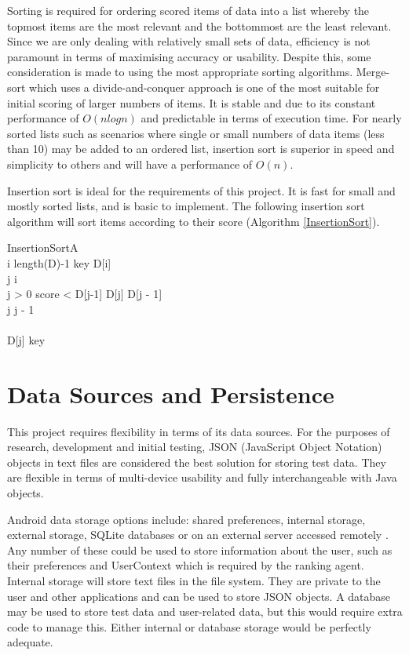 Sorting is required for ordering scored items of data into a list whereby the topmost items are the most relevant and the bottommost are the least relevant. Since we are only dealing with relatively small sets of data, efficiency is not paramount in terms of maximising accuracy or usability. Despite this, some consideration is made to using the most appropriate sorting algorithms. 
Merge-sort which uses a divide-and-conquer approach is one of the most suitable for initial scoring of larger numbers of items. It is stable and due to its constant performance of $O(nlogn)$ and predictable in terms of execution time. 
For nearly sorted lists such as scenarios where single or small numbers of data items (less than 10) may be added to an ordered list, insertion sort is superior in speed and simplicity to others and will have a performance of $O(n)$.

Insertion sort is ideal for the requirements of this project. It is fast for small and mostly sorted lists, and is basic to implement. The following insertion sort algorithm will sort items according to their score (Algorithm \ref{InsertionSort}).

\begin{pseudocode}{InsertionSort}{A}
	\label{InsertionSort}
	\\
	\FOR i \TO length(D)-1 \DO
	\BEGIN
		key \GETS D[i]\\
		j \GETS i\\
		\WHILE j > 0 \AND score < D[j-1] \DO
		\BEGIN
			D[j] \GETS D[j - 1]\\
			j \GETS j - 1\\
		\END \\
		D[j] \GETS key \\
	\END	
		
\end{pseudocode}

\section{Data Sources and Persistence}

This project requires flexibility in terms of its data sources. For the purposes of research, development and initial testing, JSON (JavaScript Object Notation) objects in text files are considered the best solution for storing test data. They are flexible in terms of multi-device usability and fully interchangeable with Java objects.

Android data storage options include: shared preferences, internal storage, external storage, SQLite databases or on an external server accessed remotely \cite{BeginningAndroidDataPersistence}. Any number of these could be used to store information about the user, such as their preferences and UserContext which is required by the ranking agent. Internal storage will store text files in the file system. They are private to the user and other applications and can be used to store JSON objects. A database may be used to store test data and user-related data, but this would require extra code to manage this. Either internal or database storage would be perfectly adequate.

